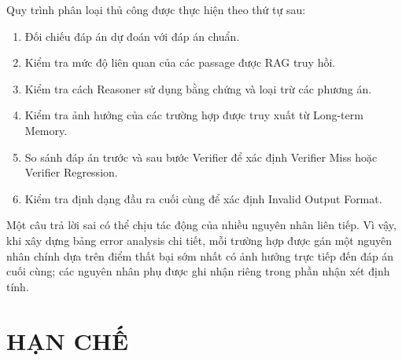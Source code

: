 \noindent
Quy trình phân loại thủ công được thực hiện theo thứ tự sau:

\begin{enumerate}
    \item Đối chiếu đáp án dự đoán với đáp án chuẩn.
    \item Kiểm tra mức độ liên quan của các passage được RAG truy hồi.
    \item Kiểm tra cách Reasoner sử dụng bằng chứng và loại trừ các
    phương án.
    \item Kiểm tra ảnh hưởng của các trường hợp được truy xuất từ
    Long-term Memory.
    \item So sánh đáp án trước và sau bước Verifier để xác định
    Verifier Miss hoặc Verifier Regression.
    \item Kiểm tra định dạng đầu ra cuối cùng để xác định Invalid
    Output Format.
\end{enumerate}

\noindent
Một câu trả lời sai có thể chịu tác động của nhiều nguyên nhân liên
tiếp. Vì vậy, khi xây dựng bảng error analysis chi tiết, mỗi trường
hợp được gán một nguyên nhân chính dựa trên điểm thất bại sớm nhất
có ảnh hưởng trực tiếp đến đáp án cuối cùng; các nguyên nhân phụ được
ghi nhận riêng trong phần nhận xét định tính.

\section{HẠN CHẾ}

